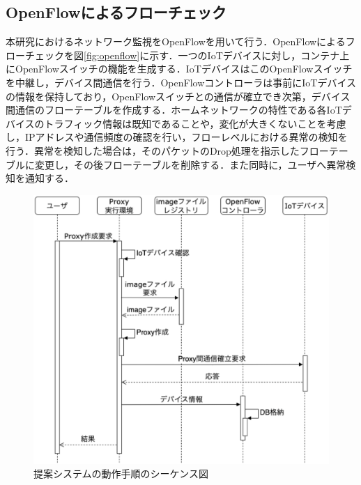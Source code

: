 \documentclass[Japanese]{dicomopapers}
\begin{document}
\subsection{OpenFlowによるフローチェック}
本研究におけるネットワーク監視をOpenFlowを用いて行う．OpenFlowによるフローチェックを図\ref{fig:openflow}に示す．一つのIoTデバイスに対し，コンテナ上にOpenFlowスイッチの機能を生成する．IoTデバイスはこのOpenFlowスイッチを中継し，デバイス間通信を行う．OpenFlowコントローラは事前にIoTデバイスの情報を保持しており，OpenFlowスイッチとの通信が確立でき次第，デバイス間通信のフローテーブルを作成する．ホームネットワークの特性である各IoTデバイスのトラフィック情報は既知であることや，変化が大きくないことを考慮し，IPアドレスや通信頻度の確認を行い，フローレベルにおける異常の検知を行う．異常を検知した場合は，そのパケットのDrop処理を指示したフローテーブルに変更し，その後フローテーブルを削除する．また同時に，ユーザへ異常検知を通知する．

\begin{figure}[!tb]
	\centering
	\includegraphics[width=\linewidth]{img/seaquence.eps}
	\caption{提案システムの動作手順のシーケンス図}
	\label{fig:seaquence}
\end{figure}
\end{document}
